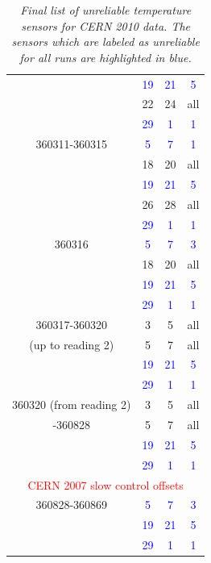 \documentclass[a4paper,10pt]{article}
\begin{document}
\begin{table}[h]
\begin{center}
\begin{tabular}{|c||c|c|c|}
              & \textcolor{blue}{19} & \textcolor{blue}{21}  & \textcolor{blue}{5} \\
              & 22 & 24 & all\\
              & \textcolor{blue}{29} & \textcolor{blue}{1}  & \textcolor{blue}{1} \\\hline
360311-360315 & \textcolor{blue}{5} & \textcolor{blue}{7} & \textcolor{blue}{1}\\
              & 18 & 20 & all\\
              & \textcolor{blue}{19} & \textcolor{blue}{21}  & \textcolor{blue}{5} \\
              & 26 & 28 & all\\
              & \textcolor{blue}{29} & \textcolor{blue}{1}  & \textcolor{blue}{1} \\\hline
360316        & \textcolor{blue}{5} & \textcolor{blue}{7} & \textcolor{blue}{3}\\
              & 18 & 20 & all\\
             & \textcolor{blue}{19} & \textcolor{blue}{21}  & \textcolor{blue}{5} \\
              & \textcolor{blue}{29} & \textcolor{blue}{1}  & \textcolor{blue}{1} \\\hline
360317-360320 & 3 &  5 & all\\
(up to reading 2) & 5 & 7 & all\\
             & \textcolor{blue}{19} & \textcolor{blue}{21}  & \textcolor{blue}{5} \\
               & \textcolor{blue}{29} & \textcolor{blue}{1}  & \textcolor{blue}{1} \\\hline
360320 (from reading 2) & 3 & 5 & all\\
-360828                 & 5 & 7 & all\\
             & \textcolor{blue}{19} & \textcolor{blue}{21}  & \textcolor{blue}{5} \\
              & \textcolor{blue}{29} & \textcolor{blue}{1}  & \textcolor{blue}{1} \\\hline
 
\multicolumn{4}{|c|}{\textcolor{red}{CERN 2007 slow control offsets}}\\\hline
360828-360869 & \textcolor{blue}{5} & \textcolor{blue}{7} & \textcolor{blue}{3}\\
              & \textcolor{blue}{19} & \textcolor{blue}{21}  & \textcolor{blue}{5} \\
              & \textcolor{blue}{29} & \textcolor{blue}{1}  & \textcolor{blue}{1} \\ \hline
\end{tabular}
\end{center}

\caption{\textsl{Final list of unreliable temperature sensors for CERN 2010 data. The sensors which are labeled as unreliable for all runs are highlighted in blue.}}
\label{tab:finalBadSensors}
\end{table}
\end{document}
